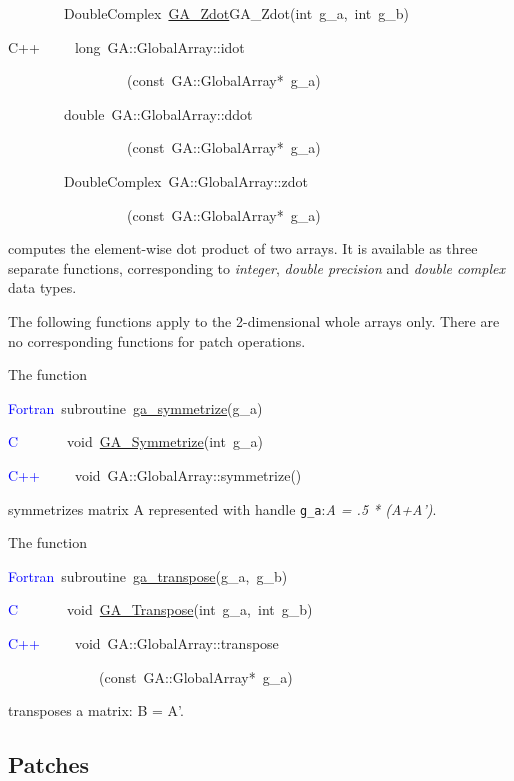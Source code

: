 ~~~~~~~~DoubleComplex~\href{https://hpc.pnl.gov/globalarrays/api/c_op_api.html\#ga_dot}{GA\_{}Zdot}GA\_Zdot(int~g\_a,~int~g\_b)~

C++~~~~~long~GA::GlobalArray::idot

~~~~~~~~~~~~~~~~~(const~GA::GlobalArray{*}~g\_a)~

~~~~~~~~double~GA::GlobalArray::ddot

~~~~~~~~~~~~~~~~~(const~GA::GlobalArray{*}~g\_a)~

~~~~~~~~DoubleComplex~GA::GlobalArray::zdot

~~~~~~~~~~~~~~~~~(const~GA::GlobalArray{*}~g\_a)

computes the element-wise dot product of two arrays. It is available
as three separate functions, corresponding to \emph{integer}, \emph{double
precision} and \emph{double complex} data types.

The following functions apply to the 2-dimensional whole arrays only.
There are no corresponding functions for patch operations.

The function

\textcolor{blue}{Fortran}~subroutine~\href{https://hpc.pnl.gov/globalarrays/api/f_op_api.html\#ga_symmetrize}{ga\_{}symmetrize}(g\_a)~

\textcolor{blue}{C}~~~~~~~void~\href{https://hpc.pnl.gov/globalarrays/api/c_op_api.html\#ga_symmetrize}{GA\_{}Symmetrize}(int~g\_a)~

\textcolor{blue}{C++}~~~~~void~GA::GlobalArray::symmetrize()

symmetrizes matrix A represented with handle \texttt{g\_a}:\emph{A
= .5 {*} (A+A')}.

The function

\textcolor{blue}{Fortran}~subroutine~\href{https://hpc.pnl.gov/globalarrays/api/f_op_api.html\#ga_transpose}{ga\_{}transpose}(g\_a,~g\_b)~

\textcolor{blue}{C}~~~~~~~void~\href{https://hpc.pnl.gov/globalarrays/api/c_op_api.html\#ga_transpose}{GA\_{}Transpose}(int~g\_a,~int~g\_b)~

\textcolor{blue}{C++}~~~~~void~GA::GlobalArray::transpose

~~~~~~~~~~~~~(const~GA::GlobalArray{*}~g\_a)

transposes a matrix: B = A'.


\subsection{Patches }

